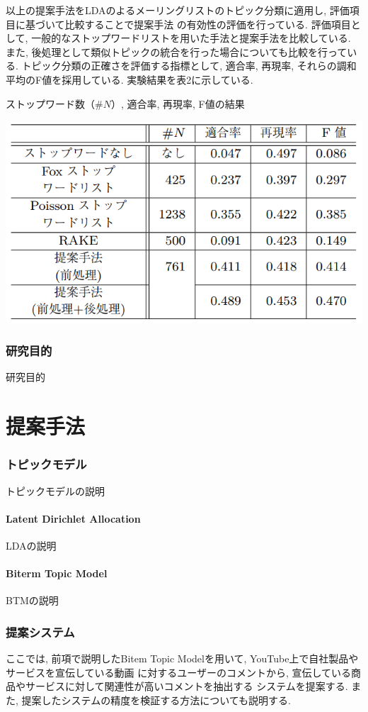 \documentclass{ltjarticle}
\begin{document}
以上の提案手法をLDAのよるメーリングリストのトピック分類に適用し, 評価項目に基づいて比較することで提案手法
の有効性の評価を行っている. 評価項目として, 一般的なストップワードリストを用いた手法と提案手法を比較している. 
また, 後処理として類似トピックの統合を行った場合についても比較を行っている. 
トピック分類の正確さを評価する指標として, 適合率, 再現率, それらの調和平均のF値を採用している. 
実験結果を表2に示している. 
\begin{table}
    \centering
    \caption{ストップワード数（$\#N$）, 適合率, 再現率, F値の結果}
    \includegraphics[]{images/table2.png}
\end{table}



\newpage
\section{研究目的}
研究目的

\newpage
\part{提案手法}
\section{トピックモデル}
トピックモデルの説明
\subsection{Latent Dirichlet Allocation}
LDAの説明
\subsection{Biterm Topic Model}
BTMの説明
\newpage
\section{提案システム}
ここでは, 前項で説明したBitem Topic Modelを用いて, YouTube上で自社製品やサービスを宣伝している動画
に対するユーザーのコメントから, 宣伝している商品やサービスに対して関連性が高いコメントを抽出する
システムを提案する. また, 提案したシステムの精度を検証する方法についても説明する. 
\end{document}
